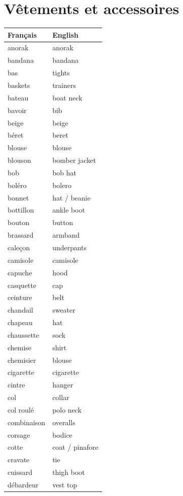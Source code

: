 \documentclass[12pt,a4paper]{article}
\begin{document}
\newpage

\section{Vêtements et accessoires}
\begin{longtable}{p{4cm} p{6cm}}
\toprule
\textbf{Français} & \textbf{English} \\
\midrule
anorak & anorak \\
bandana & bandana \\
bas & tights \\
baskets & trainers \\
bateau & boat neck \\
bavoir & bib \\
beige & beige \\
béret & beret \\
blouse & blouse \\
blouson & bomber jacket \\
bob & bob hat \\
boléro & bolero \\
bonnet & hat / beanie \\
bottillon & ankle boot \\
bouton & button \\
brassard & armband \\
caleçon & underpants \\
camisole & camisole \\
capuche & hood \\
casquette & cap \\
ceinture & belt \\
chandail & sweater \\
chapeau & hat \\
chaussette & sock \\
chemise & shirt \\
chemisier & blouse \\
cigarette & cigarette \\
cintre & hanger \\
col & collar \\
col roulé & polo neck \\
combinaison & overalls \\
corsage & bodice \\
cotte & coat / pinafore \\
cravate & tie \\
cuissard & thigh boot \\
débardeur & vest top \\

\end{longtable}
\end{document}
